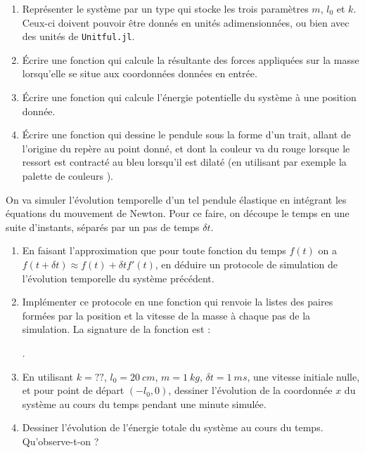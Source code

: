 \documentclass{article}
\begin{document}
\begin{enumerate}
	\item Représenter le système par un type  qui stocke les trois paramètres $m$, $l_0$ et $k$. Ceux-ci doivent pouvoir être donnés en unités adimensionnées, ou bien avec des unités de \texttt{Unitful.jl}.
	\item Écrire une fonction  qui calcule la résultante des forces appliquées sur la masse lorsqu'elle se situe aux coordonnées données en entrée.
	\item Écrire une fonction  qui calcule l'énergie potentielle du système à une position donnée.
	\item Écrire une fonction  qui dessine le pendule sous la forme d'un trait, allant de l'origine du repère au point donné, et dont la couleur va du rouge lorsque le ressort est contracté au bleu lorsqu'il est dilaté (en utilisant par exemple la palette de couleurs ).
\end{enumerate}

On va simuler l'évolution temporelle d'un tel pendule élastique en intégrant les équations du mouvement de Newton. Pour ce faire, on découpe le temps en une suite d'instants, séparés par un pas de temps $\delta t$.

\begin{enumerate}[resume]
	\item En faisant l'approximation que pour toute fonction du temps $f(t)$ on a $f(t+\delta t) \approx f(t) + \delta tf'(t)$, en déduire un protocole de simulation de l'évolution temporelle du système précédent.
	\item Implémenter ce protocole en une fonction qui renvoie la listes des paires formées par la position et la vitesse de la masse à chaque pas de la simulation. La signature de la fonction est :
	
	.
	\item En utilisant $k = ??$, $l_0 = \qty{20}{cm}$, $m = \qty{1}{kg}$, $\delta t = \qty{1}{ms}$, une vitesse initiale nulle, et pour point de départ $(-l_0, 0)$, dessiner l'évolution de la coordonnée $x$ du système au cours du temps pendant une minute simulée.
	\item Dessiner l'évolution de l'énergie totale du système au cours du temps. Qu'observe-t-on ?
\end{enumerate}
\end{document}
